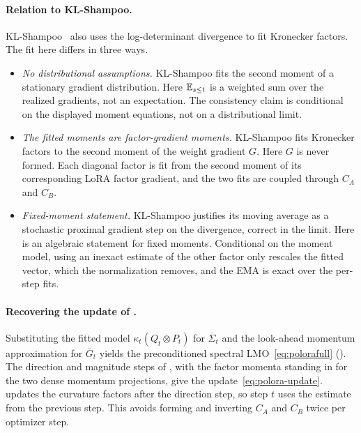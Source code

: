 \paragraph{Relation to KL-Shampoo.}
KL-Shampoo~\cite{klshampoo} also uses the log-determinant divergence to
fit Kronecker factors. The fit here differs in three ways.
\begin{itemize}[leftmargin=1.5em,itemsep=1pt,topsep=2pt]
  \item \emph{No distributional assumptions.} KL-Shampoo fits the second
  moment of a stationary gradient distribution. Here $\mathbb{E}_{s\le t}$ is a
  weighted sum over the realized gradients, not an expectation. The
  consistency claim is conditional on the displayed moment equations, not
  on a distributional limit.
  \item \emph{The fitted moments are factor-gradient moments.} KL-Shampoo
  fits Kronecker factors to the second moment of the weight gradient $G$.
  Here $G$ is never formed. Each diagonal factor is fit from the second
  moment of its corresponding LoRA factor gradient, and the two fits are
  coupled through $C_A$ and $C_B$.
  \item \emph{Fixed-moment statement.} KL-Shampoo
  justifies its moving average as a stochastic proximal gradient step on the
  divergence, correct in the limit. Here  is an
  algebraic statement for fixed moments. Conditional on the moment model,
  using an inexact estimate of the other factor only rescales the fitted
  vector, which the normalization removes, and the EMA is exact over the
  per-step fits.
\end{itemize}

\paragraph{Recovering the update of .}
Substituting the fitted model $\kappa_t(Q_t\otimes P_t)$ for
$\overline\Sigma_t$ and the look-ahead momentum approximation for
$\overline G_t$ yields the preconditioned spectral
LMO~\eqref{eq:polorafull} (). The
direction and magnitude steps of , with the
factor momenta standing in for the two dense momentum projections, give
the update~\eqref{eq:polora-update}.  updates the
curvature factors after the direction step, so step $t$ uses the estimate
from the previous step. This avoids forming and inverting $C_A$ and
$C_B$ twice per optimizer step.

